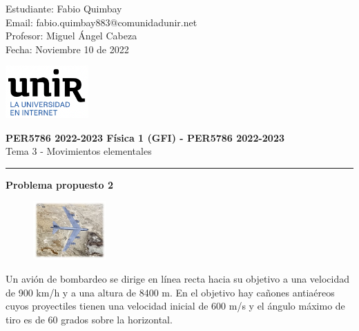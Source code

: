 \documentclass[11pt,letterpaper]{article}
\begin{document}
\pagestyle{plain}

\begin{flushleft}
Estudiante: Fabio Quimbay\\
Email: fabio.quimbay883@comunidadunir.net\\
Profesor: Miguel Ángel Cabeza\\
Fecha: Noviembre 10 de 2022\\
\end{flushleft}

\begin{flushright}\vspace{-20mm}
\includegraphics[height=2cm]{logo.png}
\end{flushright}
 
\begin{center}\vspace{0cm}
\textbf{\large PER5786 2022-2023  Física 1 (GFI) - PER5786 2022-2023}\\
 Tema 3 - Movimientos elementales
\end{center}

 
\rule{\linewidth}{0.1mm}

\bigskip
\bigskip

\textbf{Problema propuesto 2}\\

\begin{figure}
\begin{center}
\includegraphics[width=0.25\textwidth]{problema_2.png}
\end{center}
\end{figure}

Un avión de bombardeo se dirige en línea recta hacia su objetivo a una velocidad de 900 km/h y a una altura de 8400 m. En el objetivo hay cañones antiaéreos cuyos proyectiles tienen una velocidad inicial de 600 m/s y el ángulo máximo de tiro es de 60 grados sobre la horizontal.\\
\end{document}
